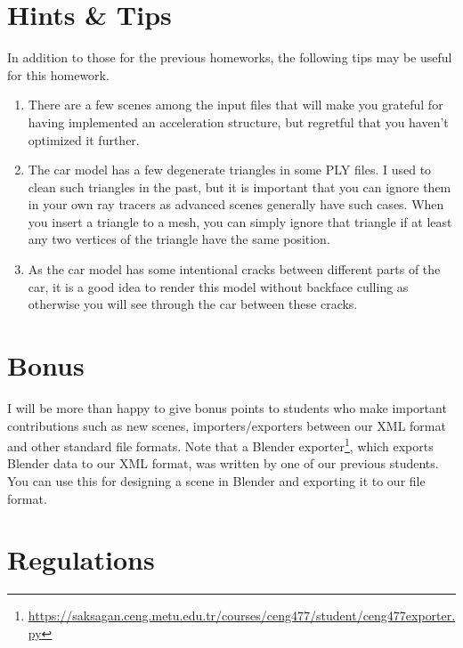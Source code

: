 \documentclass[12pt]{article}
\begin{document}
\section{Hints \& Tips}
In addition to those for the previous homeworks, the following tips may
be useful for this homework.

\begin{enumerate}

\item There are a few scenes among the input files that
will make you grateful for having implemented an acceleration
structure, but regretful that you haven't optimized it further.

\item The car model has a few degenerate triangles in some PLY files.
I used to clean such triangles in the past, but it is important that
you can ignore them in your own ray tracers as advanced scenes
generally have such cases. When you insert a triangle to a mesh,
you can simply ignore that triangle if at least any two vertices of
the triangle have the same position.

\item As the car model has some intentional cracks between different
parts of the car, it is a good idea to render this model without
backface culling as otherwise you will see through the car between
these cracks.


\end{enumerate}

\section{Bonus}

I will be more than happy to give bonus points to students who
make important contributions such as new scenes, importers/exporters
between our XML format and other standard file formats. Note that a
Blender
exporter\footnote{\url{https://saksagan.ceng.metu.edu.tr/courses/ceng477/student/ceng477exporter.py}},
which exports Blender data to our XML format, was written by one of our
previous students. You can use this for designing a scene in Blender and
exporting it to our file format.

\section{Regulations}
\end{document}
